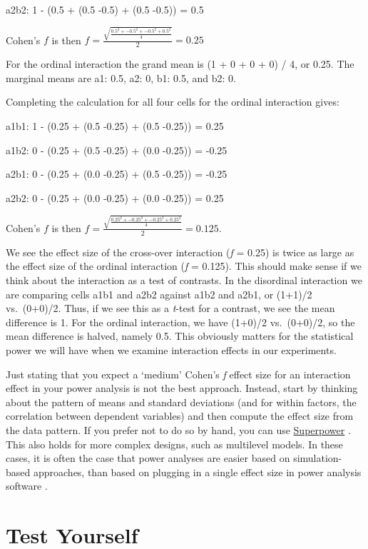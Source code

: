 \documentclass[
]{krantz}
\begin{document}
a2b2: 1 - (0.5 + (0.5 -0.5) + (0.5 -0.5)) = 0.5

Cohen's \(f\) is then \(f = \frac { \sqrt { \frac { 0.5^2 +-0.5^2 + -0.5^2 + 0.5^2 } { 4 } }}{ 2 } = 0.25\)

For the ordinal interaction the grand mean is (1 + 0 + 0 + 0) / 4, or 0.25. The marginal means are a1: 0.5, a2: 0, b1: 0.5, and b2: 0.

Completing the calculation for all four cells for the ordinal interaction gives:

a1b1: 1 - (0.25 + (0.5 -0.25) + (0.5 -0.25)) = 0.25

a1b2: 0 - (0.25 + (0.5 -0.25) + (0.0 -0.25)) = -0.25

a2b1: 0 - (0.25 + (0.0 -0.25) + (0.5 -0.25)) = -0.25

a2b2: 0 - (0.25 + (0.0 -0.25) + (0.0 -0.25)) = 0.25

Cohen's \(f\) is then \(f = \frac { \sqrt { \frac { 0.25^2 +-0.25^2 + -0.25^2 + 0.25^2 } { 4 } }}{ 2 } = 0.125\).

We see the effect size of the cross-over interaction (\emph{f} = 0.25) is twice as large as the effect size of the ordinal interaction (\emph{f} = 0.125). This should make sense if we think about the interaction as a test of contrasts. In the disordinal interaction we are comparing cells a1b1 and a2b2 against a1b2 and a2b1, or (1+1)/2 vs.~(0+0)/2. Thus, if we see this as a \emph{t}-test for a contrast, we see the mean difference is 1. For the ordinal interaction, we have (1+0)/2 vs.~(0+0)/2, so the mean difference is halved, namely 0.5. This obviously matters for the statistical power we will have when we examine interaction effects in our experiments.

Just stating that you expect a `medium' Cohen's \emph{f} effect size for an interaction effect in your power analysis is not the best approach. Instead, start by thinking about the pattern of means and standard deviations (and for within factors, the correlation between dependent variables) and then compute the effect size from the data pattern. If you prefer not to do so by hand, you can use \href{https://aaroncaldwell.us/SuperpowerBook/}{Superpower} \citep{lakens_simulation-based_2021}. This also holds for more complex designs, such as multilevel models. In these cases, it is often the case that power analyses are easier based on simulation-based approaches, than based on plugging in a single effect size in power analysis software \citep{debruine_understanding_2021}.

\hypertarget{test-yourself-4}{%
\section{Test Yourself}\label{test-yourself-4}}
\end{document}

